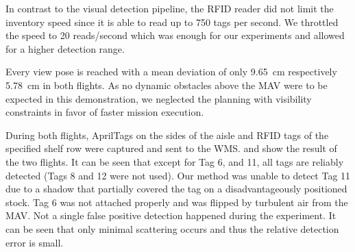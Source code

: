 In contrast to the visual detection pipeline, the RFID reader did not limit the inventory speed since it is able to read up to 750 tags per second. We throttled the speed to 20 reads/second which was enough for our experiments and allowed for a higher detection range.

Every view pose is reached with a mean deviation of only \SI{9.65}{\centi\meter} respectively \SI{5.78}{\centi\meter} in both flights.
As no dynamic obstacles above the MAV were to be expected in this demonstration, we neglected the planning with visibility constraints in favor of faster mission execution.

During both flights, AprilTags on the sides of the aisle and RFID tags of the specified shelf row were captured and sent to the WMS.
 and  show the result of the two flights. It can be seen that except for Tag 6, and 11, all tags are reliably detected (Tags 8 and 12 were not used). Our method was unable to detect Tag 11 due to a shadow that partially covered the tag on a disadvantageously positioned stock. Tag 6 was not attached properly and was flipped by turbulent air from the MAV. Not a single false positive detection happened during the experiment. It can be seen that only minimal scattering occurs and thus the relative detection error is small.

